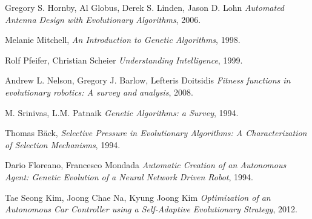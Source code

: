 \documentclass[a4paper,12pt]{article}
\begin{document}
\newpage
\begin{thebibliography}{1}
	 Gregory S. Hornby, Al Globus, Derek S. Linden, Jason D. Lohn \emph{Automated Antenna Design with Evolutionary Algorithms}, 2006.
	
	 Melanie Mitchell, \emph{An Introduction to Genetic Algorithms}, 1998.
	
	 Rolf Pfeifer, Christian Scheier \emph{Understanding Intelligence}, 1999.
	
	 Andrew L. Nelson, Gregory J. Barlow, Lefteris Doitsidis \emph{Fitness functions in evolutionary robotics: A survey and analysis}, 2008.
	
	 M. Srinivas, L.M. Patnaik \emph{Genetic Algorithms: a Survey}, 1994.
	
	 Thomas B\"{a}ck, \emph{Selective Pressure in Evolutionary Algorithms: A Characterization of Selection Mechanisms}, 1994.
	
	 Dario Floreano, Francesco Mondada \emph{Automatic Creation of an Autonomous Agent: Genetic Evolution of a Neural Network Driven Robot}, 1994.
	
	 Tae Seong Kim, Joong Chae Na, Kyung Joong Kim \emph{Optimization of an Autonomous Car Controller using a Self-Adaptive Evolutionary Strategy}, 2012.
	
	
	
	

\end{thebibliography}
\end{document}
